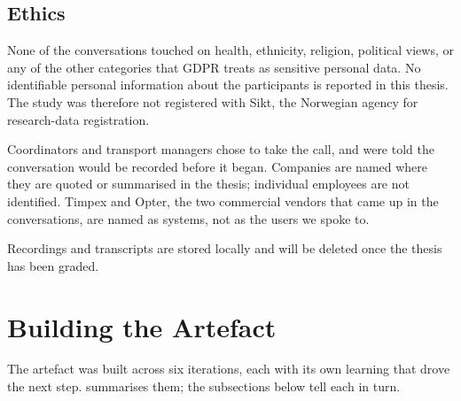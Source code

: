 \subsection{Ethics}
\label{sec:ethics}

None of the conversations touched on health, ethnicity, religion, political views, or any of the other categories that GDPR treats as sensitive personal data. No identifiable personal information about the participants is reported in this thesis. The study was therefore not registered with Sikt, the Norwegian agency for research-data registration.

Coordinators and transport managers chose to take the call, and were told the conversation would be recorded before it began. Companies are named where they are quoted or summarised in the thesis; individual employees are not identified. Timpex and Opter, the two commercial vendors that came up in the conversations, are named as systems, not as the users we spoke to.

Recordings and transcripts are stored locally and will be deleted once the thesis has been graded.


\section{Building the Artefact}
\label{sec:building-artefact}
\label{sec:iterations}

The artefact was built across six iterations, each with its own learning that drove the next step.  summarises them; the subsections below tell each in turn.

